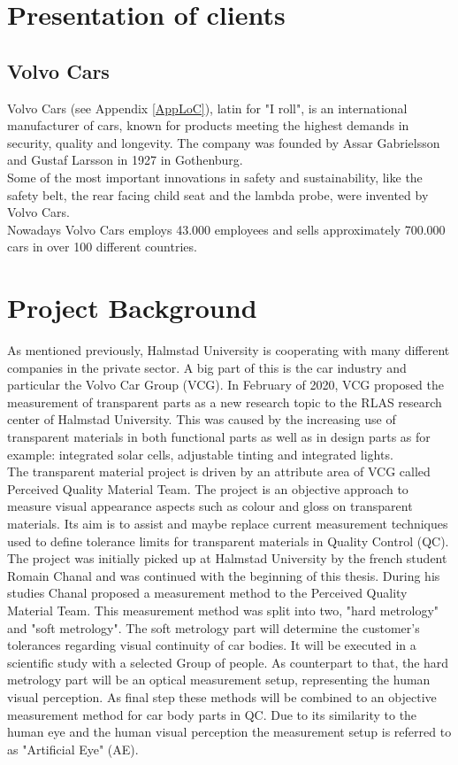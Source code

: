 \section{Presentation of clients}
\subsection{Volvo Cars}
Volvo Cars (see Appendix \ref{AppLoC}), latin for "I roll", is an international manufacturer of cars, known for products meeting the highest demands in security, quality and longevity. The company was founded by Assar Gabrielsson and Gustaf Larsson in 1927 in Gothenburg.\\
Some of the most important innovations in safety and sustainability, like the safety belt, the rear facing child seat and the lambda probe, were invented by Volvo Cars.\\
Nowadays Volvo Cars employs 43.000 employees and sells approximately 700.000 cars in over 100 different countries.\cite{VolvoCars}



\section{Project Background}
As mentioned previously, Halmstad University is cooperating with many different companies in the private sector. A big part of this is the car industry and particular the Volvo Car Group (VCG). In February of 2020, VCG proposed the measurement of transparent parts as a new research topic to the RLAS research center of Halmstad University. This was caused by the increasing use of transparent materials in both functional parts as well as in design parts as for example: integrated solar cells, adjustable tinting and integrated lights.\\
The transparent material project is driven by an attribute area of VCG called Perceived Quality Material Team. The project is an objective approach to measure visual appearance aspects such as colour and gloss on transparent materials. Its aim is to assist and maybe replace current measurement techniques used to define tolerance limits for transparent materials in Quality Control (QC).\\
The project was initially picked up at Halmstad University by the french student Romain Chanal and was continued with the beginning of this thesis. During his studies Chanal proposed a measurement method to the Perceived Quality Material Team. This measurement method was split into two, "hard metrology" and "soft metrology". The soft metrology part will determine the customer's tolerances regarding visual continuity of car bodies. It will be executed in a scientific study with a selected Group of people. As counterpart to that, the hard metrology part will be an optical measurement setup, representing the human visual perception. As final step these methods will be combined to an objective measurement method for car body parts in QC. Due to its similarity to the human eye and the human visual perception the measurement setup is referred to as "Artificial Eye" (AE).\cite{Chanal2020}

